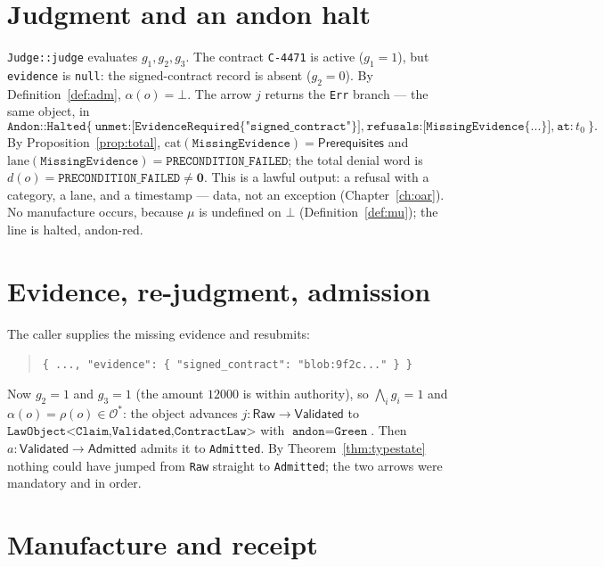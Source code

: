 \documentclass[11pt,oneside]{book}
\theoremstyle{definition}
\theoremstyle{plain}
\theoremstyle{remark}
\newcommand{\Adm}{\mathcal{O}^{*}}             %
\newcommand{\muop}{\mu}                        %
\newcommand{\adm}{\alpha}                      %
\newcommand{\Rfsl}{\bot}                        %
\newcommand{\Raw}{\mathsf{Raw}}
\newcommand{\Val}{\mathsf{Validated}}
\newcommand{\Admd}{\mathsf{Admitted}}
\newcommand{\code}[1]{\texttt{#1}}
\begin{document}
\section{Judgment and an andon halt}

\code{Judge::judge} evaluates $g_1,g_2,g_3$. The contract \code{C-4471} is active
($g_1=1$), but \code{evidence} is \code{null}: the signed-contract record is absent
($g_2=0$). By Definition~\ref{def:adm}, $\adm(o)=\Rfsl$. The arrow $j$ returns the
\code{Err} branch --- the same object, in
\[
\code{Andon::Halted\{}\ \code{unmet:[EvidenceRequired\{"signed\_contract"\}],}\
\code{refusals:[MissingEvidence\{...\}],}\ \code{at:}\,t_0\ \code{\}}.
\]
By Proposition~\ref{prop:total}, $\text{cat}(\code{MissingEvidence})=\textsf{Prerequisites}$
and $\text{lane}(\code{MissingEvidence})=\code{PRECONDITION\_FAILED}$; the total denial word
is $d(o)=\code{PRECONDITION\_FAILED}\neq\bm0$. This is a lawful output: a refusal with a
category, a lane, and a timestamp --- data, not an exception (Chapter~\ref{ch:oar}). No
manufacture occurs, because $\muop$ is undefined on $\Rfsl$ (Definition~\ref{def:mu}); the
line is halted, andon-red.

\section{Evidence, re-judgment, admission}

The caller supplies the missing evidence and resubmits:
\begin{quote}\small
\code{\{ ..., "evidence": \{ "signed\_contract": "blob:9f2c..." \} \}}
\end{quote}
Now $g_2=1$ and $g_3=1$ (the amount $12000$ is within authority), so
$\bigwedge_i g_i=1$ and $\adm(o)=\rho(o)\in\Adm$: the object advances $j:\Raw\to\Val$ to
$\code{LawObject<Claim,Validated,ContractLaw>}$ with $\code{andon}=\code{Green}$. Then
$a:\Val\to\Admd$ admits it to \code{Admitted}. By Theorem~\ref{thm:typestate} nothing could
have jumped from \code{Raw} straight to \code{Admitted}; the two arrows were mandatory and
in order.

\section{Manufacture and receipt}
\end{document}
